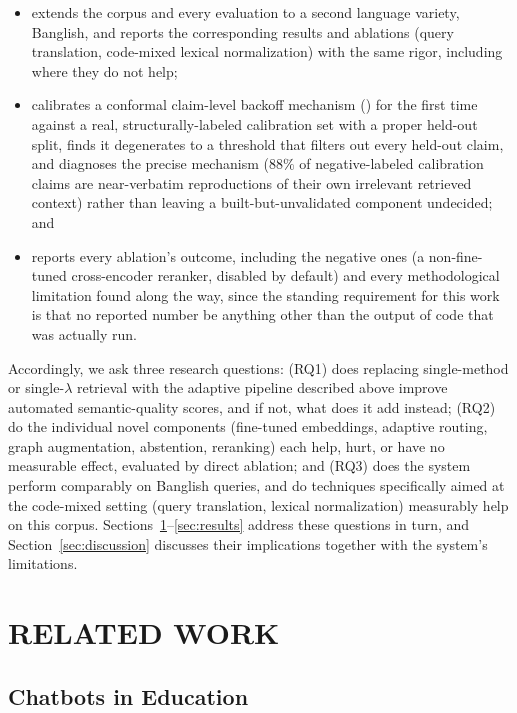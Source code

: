 \documentclass[a4paper,twoside]{article}
\begin{document}
\begin{itemize}
  \item extends the corpus and every evaluation to a second language variety, Banglish, and reports the corresponding results and ablations (query translation, code-mixed lexical normalization) with the same rigor, including where they do not help;
  \item calibrates a conformal claim-level backoff mechanism (\citealp{mohri2024conformal}) for the first time against a real, structurally-labeled calibration set with a proper held-out split, finds it degenerates to a threshold that filters out every held-out claim, and diagnoses the precise mechanism ($88\%$ of negative-labeled calibration claims are near-verbatim reproductions of their own irrelevant retrieved context) rather than leaving a built-but-unvalidated component undecided; and
  \item reports every ablation's outcome, including the negative ones (a non-fine-tuned cross-encoder reranker, disabled by default) and every methodological limitation found along the way, since the standing requirement for this work is that no reported number be anything other than the output of code that was actually run.
\end{itemize}

Accordingly, we ask three research questions: (RQ1) does replacing single-method or single-$\lambda$ retrieval with the adaptive pipeline described above improve automated semantic-quality scores, and if not, what does it add instead; (RQ2) do the individual novel components (fine-tuned embeddings, adaptive routing, graph augmentation, abstention, reranking) each help, hurt, or have no measurable effect, evaluated by direct ablation; and (RQ3) does the system perform comparably on Banglish queries, and do techniques specifically aimed at the code-mixed setting (query translation, lexical normalization) measurably help on this corpus. Sections~\ref{sec:related}--\ref{sec:results} address these questions in turn, and Section~\ref{sec:discussion} discusses their implications together with the system's limitations.

\section{\uppercase{Related Work}}
\label{sec:related}

\subsection{Chatbots in Education}
\end{document}
